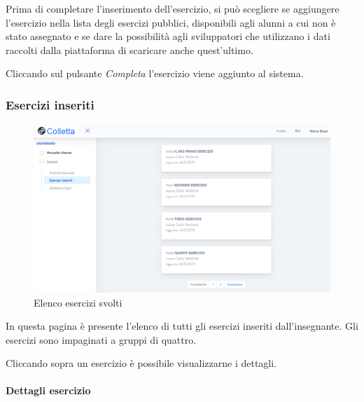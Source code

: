 Prima di completare l'inserimento dell'esercizio, si può scegliere se aggiungere l'esercizio nella lista degli esercizi pubblici, disponibili agli alunni a cui non è stato assegnato e se dare la possibilità agli sviluppatori che utilizzano i dati raccolti dalla piattaforma di scaricare anche quest'ultimo.
          
            Cliccando sul pulsante \textit{Completa} l'esercizio viene aggiunto al sistema.
          
\subsubsection{Esercizi inseriti}
\begin{figure}[H]
            	\centering
        		\includegraphics[width=17cm]{sez/img/insegnante/eserinseriti.PNG} 
            	\caption{Elenco esercizi svolti}\label{fig:1}
        	\end{figure}  
        	In questa pagina è presente l'elenco di tutti gli esercizi inseriti dall'insegnante. Gli esercizi sono impaginati a gruppi di quattro.
        	
        	 Cliccando sopra un esercizio è possibile visualizzarne i dettagli.               
\newpage
\paragraph{Dettagli esercizio}\mbox{}\\   

